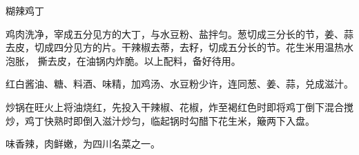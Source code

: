 \begin{recipe}[宫保鸡丁]{糊辣鸡丁}

\ingredients


\preparation

\step 鸡肉洗净，宰成五分见方的大丁，与水豆粉、盐拌匀。葱切成三分长的节，姜、蒜
去皮，切成四分见方的片。干辣椒去蒂，去籽，切成五分长的节。花生米用温热水泡胀，
撕去皮，在油锅内炸脆。以上配料，备好待用。

\step 红白酱油、糖、料酒、味精，加鸡汤、水豆粉少许，连同葱、姜、蒜，兑成滋汁。

\step 炒锅在旺火上将油烧红，先投入干辣椒、花椒，炸至褐红色时即将鸡丁倒下混合搅
炒，鸡丁快熟时即倒入滋汁炒匀，临起锅时勾醋下花生米，簸两下入盘。

\features

味香辣，肉鲜嫩，为四川名菜之一。

\end{recipe}


